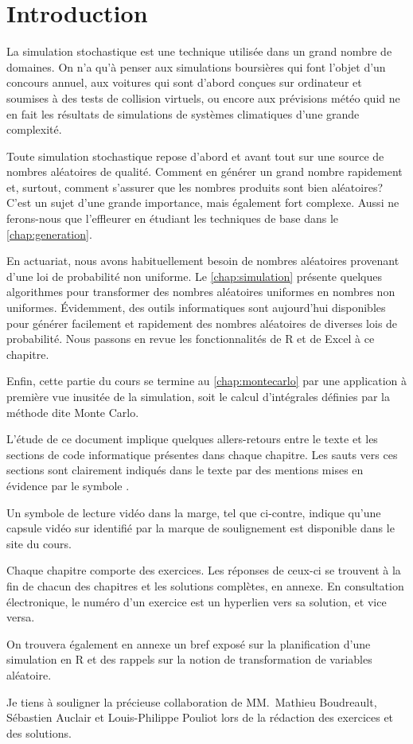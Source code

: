 \chapter*{Introduction}

La simulation stochastique est une technique utilisée dans un grand
nombre de domaines. On n'a qu'à penser aux simulations boursières qui
font l'objet d'un concours annuel, aux voitures qui sont d'abord
conçues sur ordinateur et soumises à des tests de collision virtuels,
ou encore aux prévisions météo quid ne en fait les résultats de
simulations de systèmes climatiques d'une grande complexité.

Toute simulation stochastique repose d'abord et avant tout sur une
source de nombres aléatoires de qualité. Comment en générer un grand
nombre rapidement et, surtout, comment s'assurer que les nombres
produits sont bien aléatoires? C'est un sujet d'une grande importance,
mais également fort complexe. Aussi ne ferons-nous que l'effleurer en
étudiant les techniques de base dans le
\autoref{chap:generation}.

En actuariat, nous avons habituellement besoin de nombres aléatoires
provenant d'une loi de probabilité non uniforme. Le
\autoref{chap:simulation} présente quelques algorithmes pour
transformer des nombres aléatoires uniformes en nombres non uniformes.
Évidemment, des outils informatiques sont aujourd'hui disponibles pour
générer facilement et rapidement des nombres aléatoires de diverses
lois de probabilité. Nous passons en revue les fonctionnalités de R et
de Excel à ce chapitre.

Enfin, cette partie du cours se termine au
\autoref{chap:montecarlo} par une application à première vue
inusitée de la simulation, soit le calcul d'intégrales définies par la
méthode dite Monte Carlo.

L'étude de ce document implique quelques allers-retours entre le texte
et les sections de code informatique présentes dans chaque chapitre.
Les sauts vers ces sections sont clairement indiqués dans le texte par
des mentions mises en évidence par le symbole {\ForwardToEnd}.

Un symbole de lecture vidéo dans la marge, tel que ci-contre, indique
qu'une capsule vidéo sur  identifié par la marque de
soulignement est disponible dans le site du cours.

Chaque chapitre comporte des exercices. Les réponses de ceux-ci se
trouvent à la fin de chacun des chapitres et les solutions complètes,
en annexe. En consultation électronique, le numéro d'un exercice est
un hyperlien vers sa solution, et vice versa.

On trouvera également en annexe un bref exposé sur la planification
d'une simulation en R et des rappels sur la notion de transformation
de variables aléatoire.

Je tiens à souligner la précieuse collaboration de MM.~Mathieu
Boudreault, Sébastien Auclair et Louis-Philippe Pouliot lors de la
rédaction des exercices et des solutions.

